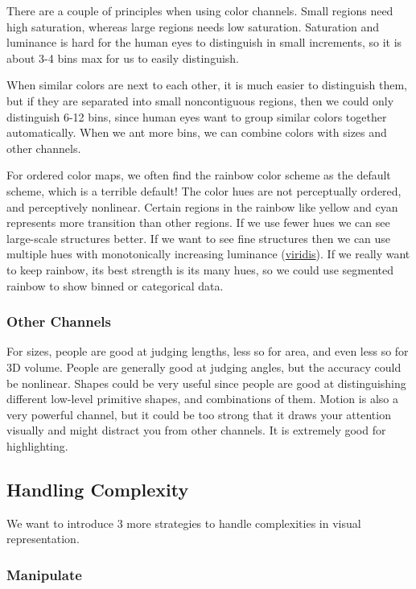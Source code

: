 \documentclass[letterpaper, 11pt]{article}
\numberwithin{equation}{section}
\numberwithin{figure}{section}
\begin{document}
There are a couple of principles when using color channels. Small regions need
high saturation, whereas large regions needs low saturation. Saturation and
luminance is hard for the human eyes to distinguish in small increments, so it
is about 3-4 bins max for us to easily distinguish.

When similar colors are next to each other, it is much easier to distinguish
them, but if they are separated into small noncontiguous regions, then we could
only distinguish 6-12 bins, since human eyes want to group similar colors
together automatically. When we ant more bins, we can combine colors with sizes
and other channels.

For ordered color maps, we often find the rainbow color scheme as the default
scheme, which is a terrible default! The color hues are not perceptually
ordered, and perceptively nonlinear. Certain regions in the rainbow like yellow
and cyan represents more transition than other regions. If we use fewer hues we
can see large-scale structures better. If we want to see fine structures then we
can use multiple hues with monotonically increasing luminance (\href{https://cran.r-project.org/web/packages/viridis/vignettes/intro-to-viridis.html}{viridis}). If we
really want to keep rainbow, its best strength is its many hues, so we could use
segmented rainbow to show binned or categorical data.

\subsubsection{Other Channels}

For sizes, people are good at judging lengths, less so for area, and even less
so for 3D volume. People are generally good at judging angles, but the accuracy
could be nonlinear. Shapes could be very useful since people are good at
distinguishing different low-level primitive shapes, and combinations of them.
Motion is also a very powerful channel, but it could be too strong that it draws
your attention visually and might distract you from other channels. It is
extremely good for highlighting.

\subsection{Handling Complexity}

We want to introduce 3 more strategies to handle complexities in visual
representation.

\subsubsection{Manipulate}
\end{document}
